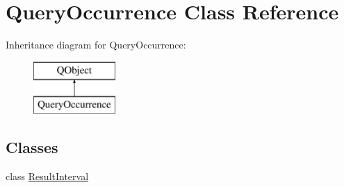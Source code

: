 \hypertarget{class_query_occurrence}{}\section{Query\+Occurrence Class Reference}
\label{class_query_occurrence}
Inheritance diagram for Query\+Occurrence\+:\begin{figure}[H]
\begin{center}
\leavevmode
\includegraphics[height=2.000000cm]{class_query_occurrence}
\end{center}
\end{figure}
\subsection*{Classes}
\begin{DoxyCompactItemize}
\item 
class \hyperlink{class_query_occurrence_1_1_result_interval}{Result\+Interval}
\end{DoxyCompactItemize}
